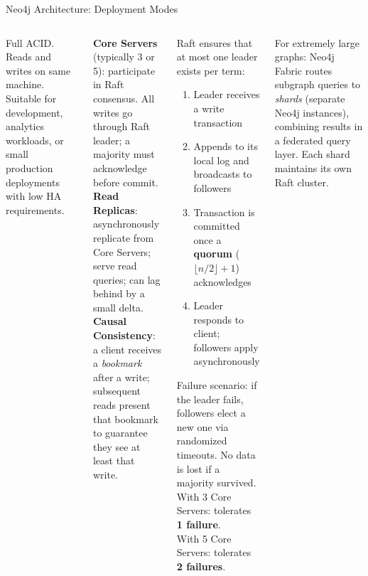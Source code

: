 \documentclass[aspectratio=169]{beamer}
\begin{document}
\begin{frame}{Neo4j Architecture: Deployment Modes}
  \begin{columns}[T]
      \begin{tcolorbox}[neo4jbox, title=Single Instance]
        \scriptsize
        Full ACID. Reads and writes on same machine. Suitable for development, analytics workloads, or small production deployments with low HA requirements.
      \end{tcolorbox}
      \vspace{0.2cm}
      \begin{tcolorbox}[neo4jbox, title=Causal Clustering (HA)]
        \scriptsize
        \textbf{Core Servers} (typically 3 or 5): participate in Raft consensus. All writes go through Raft leader; a majority must acknowledge before commit.
        \vspace{0.1cm}\\
        \textbf{Read Replicas}: asynchronously replicate from Core Servers; serve read queries; can lag behind by a small delta.
        \vspace{0.1cm}\\
        \textbf{Causal Consistency}: a client receives a \textit{bookmark} after a write; subsequent reads present that bookmark to guarantee they see at least that write.
      \end{tcolorbox}
      \begin{tcolorbox}[deepdivebox, title={Deep Dive: Raft Consensus in Neo4j}]
        \scriptsize
        Raft ensures that at most one leader exists per term:
        \begin{enumerate}
          \item Leader receives a write transaction
          \item Appends to its local log and broadcasts to followers
          \item Transaction is committed once a \textbf{quorum} ($\lfloor n/2 \rfloor + 1$) acknowledges
          \item Leader responds to client; followers apply asynchronously
        \end{enumerate}
        Failure scenario: if the leader fails, followers elect a new one via randomized timeouts. No data is lost if a majority survived.
        \vspace{0.1cm}\\
        With 3 Core Servers: tolerates \textbf{1 failure}.\\
        With 5 Core Servers: tolerates \textbf{2 failures}.
      \end{tcolorbox}
      \vspace{0.2cm}
      \begin{tcolorbox}[infobox, title=Neo4j Fabric (Sharding)]
        \scriptsize
        For extremely large graphs: Neo4j Fabric routes subgraph queries to \textit{shards} (separate Neo4j instances), combining results in a federated query layer. Each shard maintains its own Raft cluster.
      \end{tcolorbox}
  \end{columns}
\end{frame}
\end{document}
